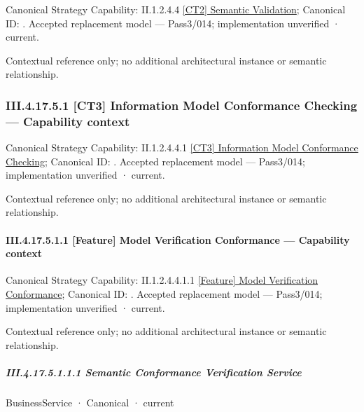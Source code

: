 {\small Canonical Strategy Capability: II.1.2.4.4 \hyperref[element:5dfb80f15eff4ec8bbb60016d36a5cd1]{[CT2] Semantic Validation}; Canonical ID: \texttt{}. Accepted replacement model — Pass3/014; implementation unverified · current.}\par
Contextual reference only; no additional architectural instance or semantic relationship.\par
\subsubsection*{III.4.17.5.1 [CT3] Information Model Conformance Checking — Capability context}
\label{navigation:III.4.17.5.1}

{\small Canonical Strategy Capability: II.1.2.4.4.1 \hyperref[element:a3a6683b5a48418ca51c94784fc24bee]{[CT3] Information Model Conformance Checking}; Canonical ID: \texttt{}. Accepted replacement model — Pass3/014; implementation unverified · current.}\par
Contextual reference only; no additional architectural instance or semantic relationship.\par
\paragraph*{III.4.17.5.1.1 [Feature] Model Verification Conformance — Capability context}
\label{navigation:III.4.17.5.1.1}

{\small Canonical Strategy Capability: II.1.2.4.4.1.1 \hyperref[element:89e8a277738845cbb768e8685e8e2d56]{[Feature] Model Verification Conformance}; Canonical ID: \texttt{}. Accepted replacement model — Pass3/014; implementation unverified · current.}\par
Contextual reference only; no additional architectural instance or semantic relationship.\par
\subparagraph*{III.4.17.5.1.1.1 Semantic Conformance Verification Service}
\label{navigation:III.4.17.5.1.1.1}

\label{element:3d492f97eb3f4d50a1c448477c61bf2b}
{\small BusinessService · Canonical · current}\par

